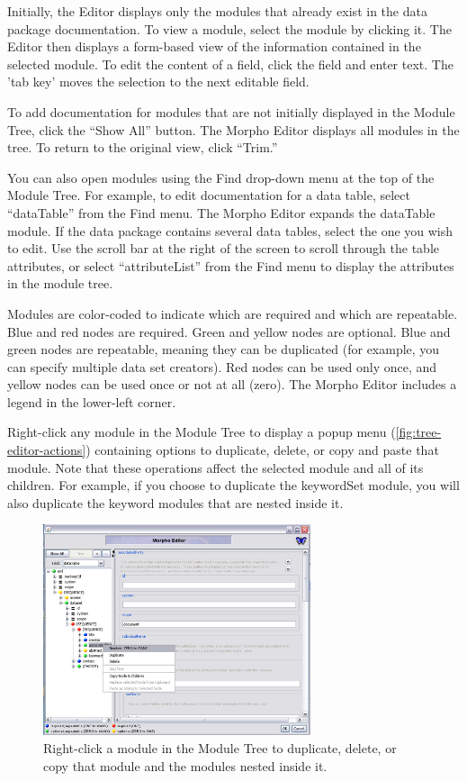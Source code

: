 Initially, the Editor displays only the modules that already exist in
the data package documentation. To view a module, select the module by
clicking it. The Editor then displays a form-based view of the
information contained in the selected module. To edit the content of a
field, click the field and enter text. The 'tab key' moves the selection
to the next editable field. 

To add documentation for modules that are not initially displayed in the
Module Tree, click the ``Show All'' button. The Morpho Editor displays
all modules in the tree. To return to the original view, click ``Trim.'' 

You can also open modules using the Find drop-down menu at the top of
the Module Tree. For example, to edit documentation for a data table,
select ``dataTable'' from the Find menu. The Morpho Editor expands the
dataTable module. If the data package contains several data tables,
select the one you wish to edit. Use the scroll bar at the right of the
screen to scroll through the table attributes, or select
``attributeList'' from the Find menu to display the attributes in the
module tree.

Modules are color-coded to indicate which are required and which are
repeatable. Blue and red nodes are required. Green and yellow nodes are
optional. Blue and green nodes are repeatable, meaning they can be
duplicated (for example, you can specify multiple data set creators). Red
nodes can be used only once, and yellow nodes can be used once or not at
all (zero). The Morpho Editor includes a legend in the lower-left
corner.

Right-click any module in the Module Tree to display a popup menu
(\autoref{fig:tree-editor-actions}) containing options to duplicate,
delete, or copy and paste that module. Note that these operations affect
the selected module and all of its children. For example, if you choose
to duplicate the keywordSet module, you will also duplicate the keyword
modules that are nested inside it.

\begin{figure}
  \centering
    \includegraphics[width=0.7\textwidth]{images/tree-editor-actions.jpg}
  \caption{Right-click a module in the Module Tree to duplicate, delete,
    or copy that module and the modules nested inside it.}
  \label{fig:tree-editor-actions}
\end{figure}
